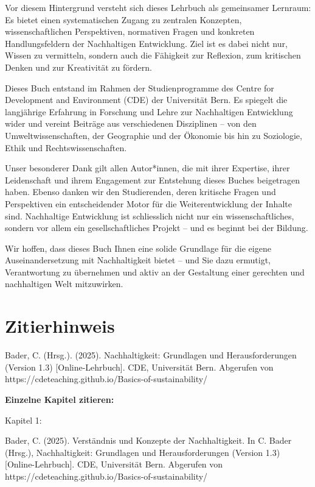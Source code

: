 \documentclass[
  nswissgerman,
  a4paper,
  DIV=11,
  numbers=noendperiod,
  oneside,
  openany]{scrreprt}
\begin{document}
Vor diesem Hintergrund versteht sich dieses Lehrbuch als gemeinsamer
Lernraum: Es bietet einen systematischen Zugang zu zentralen Konzepten,
wissenschaftlichen Perspektiven, normativen Fragen und konkreten
Handlungsfeldern der Nachhaltigen Entwicklung. Ziel ist es dabei nicht
nur, Wissen zu vermitteln, sondern auch die Fähigkeit zur Reflexion, zum
kritischen Denken und zur Kreativität zu fördern.

Dieses Buch entstand im Rahmen der Studienprogramme des Centre for
Development and Environment (CDE) der Universität Bern. Es spiegelt die
langjährige Erfahrung in Forschung und Lehre zur Nachhaltigen
Entwicklung wider und vereint Beiträge aus verschiedenen Disziplinen --
von den Umweltwissenschaften, der Geographie und der Ökonomie bis hin zu
Soziologie, Ethik und Rechtswissenschaften.

Unser besonderer Dank gilt allen Autor*innen, die mit ihrer Expertise,
ihrer Leidenschaft und ihrem Engagement zur Entstehung dieses Buches
beigetragen haben. Ebenso danken wir den Studierenden, deren kritische
Fragen und Perspektiven ein entscheidender Motor für die
Weiterentwicklung der Inhalte sind. Nachhaltige Entwicklung ist
schliesslich nicht nur ein wissenschaftliches, sondern vor allem ein
gesellschaftliches Projekt -- und es beginnt bei der Bildung.

Wir hoffen, dass dieses Buch Ihnen eine solide Grundlage für die eigene
Auseinandersetzung mit Nachhaltigkeit bietet -- und Sie dazu ermutigt,
Verantwortung zu übernehmen und aktiv an der Gestaltung einer gerechten
und nachhaltigen Welt mitzuwirken.

\section*{Zitierhinweis}\label{zitierhinweis}


Bader, C. (Hrsg.). (2025). Nachhaltigkeit: Grundlagen und
Herausforderungen (Version 1.3) {[}Online-Lehrbuch{]}. CDE, Universität
Bern. Abgerufen von
https://cdeteaching.github.io/Basics-of-sustainability/

\textbf{Einzelne Kapitel zitieren:}

Kapitel 1:

Bader, C. (2025). Verständnis und Konzepte der Nachhaltigkeit. In C.
Bader (Hrsg.), Nachhaltigkeit: Grundlagen und Herausforderungen (Version
1.3) {[}Online-Lehrbuch{]}. CDE, Universität Bern. Abgerufen von
https://cdeteaching.github.io/Basics-of-sustainability/
\end{document}
